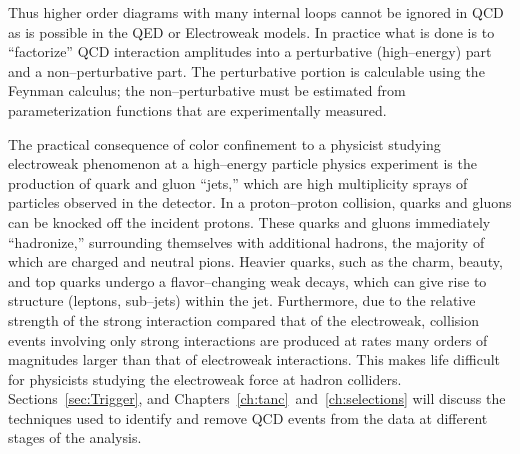 Thus higher order diagrams with many internal loops cannot be ignored in QCD\@
as is possible in the QED or Electroweak models.  In practice what is done is to
``factorize'' QCD interaction amplitudes into a perturbative (high--energy) part
and a non--perturbative part.  The perturbative portion is calculable using the
Feynman calculus; the non--perturbative must be estimated from parameterization
functions that are experimentally measured.

The practical consequence of color confinement to a physicist studying
electroweak phenomenon at a high--energy
particle physics experiment is the production of quark and gluon ``jets,'' which
are high multiplicity sprays of particles observed in the detector.  In a
proton--proton collision, quarks and gluons can be knocked off the incident
protons.  These quarks and gluons immediately ``hadronize,'' surrounding
themselves with additional hadrons, the majority of which are charged and
neutral pions.  Heavier quarks, such as the charm, beauty, and top quarks
undergo a flavor--changing weak decays, which can give rise to structure
(leptons, sub--jets) within the jet.  Furthermore, due to the relative strength
of the strong interaction compared that of the electroweak, collision events
involving only strong interactions are produced at rates many orders of
magnitudes larger than that of electroweak interactions.  This makes life
difficult for physicists studying the electroweak force at hadron colliders.
Sections~\ref{sec:Trigger}, and Chapters~\ref{ch:tanc}~and~\ref{ch:selections}
will discuss the techniques used to identify and remove QCD events from the data
at different stages of the analysis.

